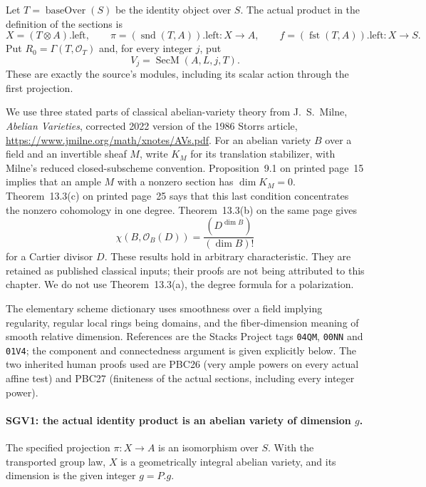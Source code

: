 \documentclass[11pt,a4paper]{article}
\numberwithin{equation}{section}
\theoremstyle{remark}\newtheorem{remark}[theorem]{Remark}
\begin{document}
Let $T=\operatorname{baseOver}(S)$ be the identity object over $S$.
The actual product in the definition of the sections is
\[
 X=(T\otimes A).\mathrm{left},\qquad
 \pi=(\operatorname{snd}(T,A)).\mathrm{left}:X\longrightarrow A,
 \qquad
 f=(\operatorname{fst}(T,A)).\mathrm{left}:X\longrightarrow S.
\]
Put $R_0=\Gamma(T,\mathcal O_T)$ and, for every integer $j$, put
\[
 V_j=\operatorname{SecM}(A,L,j,T).
                                                        \tag{SGV.1}
\]
These are exactly the source's modules, including its scalar action
through the first projection.

We use three stated parts of classical abelian-variety theory from
J.~S.~Milne, \emph{Abelian Varieties}, corrected 2022 version of the
1986 Storrs article,
\url{https://www.jmilne.org/math/xnotes/AVs.pdf}.
For an abelian variety $B$ over a field and an invertible sheaf $M$,
write $K_M$ for its translation stabilizer, with Milne's reduced
closed-subscheme convention.  Proposition~9.1 on printed page~15
implies that an ample $M$ with a nonzero section has
$\dim K_M=0$.  Theorem~13.3(c) on printed page~25 says that this last
condition concentrates the nonzero cohomology in one degree.
Theorem~13.3(b) on the same page gives
\[
 \chi(B,\mathcal O_B(D))=\frac{(D^{\dim B})}{(\dim B)!}
                                                        \tag{SGV.2}
\]
for a Cartier divisor $D$.  These results hold in arbitrary
characteristic.  They are retained as published classical inputs;
their proofs are not being attributed to this chapter.  We do not
use Theorem~13.3(a), the degree formula for a polarization.

The elementary scheme dictionary uses smoothness over a field implying
regularity, regular local rings being domains, and the fiber-dimension
meaning of smooth relative dimension.  References are the Stacks
Project tags \nolinkurl{04QM}, \nolinkurl{00NN} and
\nolinkurl{01V4}; the component and connectedness argument is given
explicitly below.  The two inherited human proofs used are PBC26
(very ample powers on every actual affine test) and PBC27 (finiteness
of the actual sections, including every integer power).

\paragraph{SGV1: the actual identity product is an abelian variety of dimension \(g\).}
\label{claim:SGV1}
The specified projection $\pi:X\to A$ is an isomorphism over $S$.
With the transported group law, $X$ is a geometrically integral
abelian variety, and its dimension is the given integer $g=P.g$.
\end{document}

